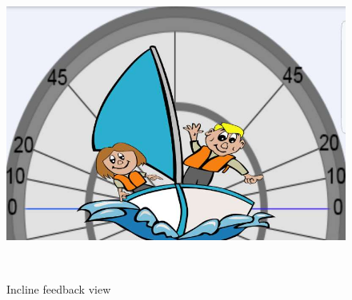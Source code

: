 \begin{figure}[H] 
 	\centering
	\begin{minipage}[c]{0.6\textwidth}
	\includegraphics[width=\textwidth]{Figures/incline.jpg}
	\caption{Incline feedback view}
	\label{feedback-incline}
	\end{minipage}
	~
	\begin{minipage}[c]{.3\textwidth}

\end{minipage}
\end{figure}
